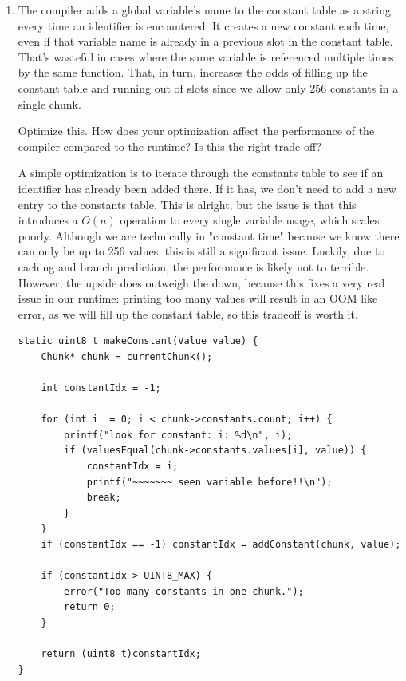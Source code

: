 \documentclass{article}
\begin{document}
\begin{enumerate}
    \item {
        The compiler adds a global variable’s name to the constant table as a string every time an identifier is encountered. It creates a new constant each time, even if that variable name is already in a previous slot in the constant table. That’s wasteful in cases where the same variable is referenced multiple times by the same function. That, in turn, increases the odds of filling up the constant table and running out of slots since we allow only 256 constants in a single chunk.

        Optimize this. How does your optimization affect the performance of the compiler compared to the runtime? Is this the right trade-off?

        A simple optimization is to iterate through the constants table to see if 
        an identifier has already been added there. If it has, we don't need to 
        add a new entry to the constants table. This is alright, but the issue 
        is that this introduces a \(O(n)\) operation to every single variable
        usage, which scales poorly. Although we are technically in "constant time"
        because we know there can only be up to 256 values, this is still a significant 
        issue. Luckily, due to caching and branch prediction, the performance is likely 
        not to terrible. However, the upside does outweigh the down, because this 
        fixes a very real issue in our runtime: printing too many values will 
        result in an OOM like error, as we will fill up the constant table, so 
        this tradeoff is worth it.

        \begin{verbatim}
static uint8_t makeConstant(Value value) {
    Chunk* chunk = currentChunk();

    int constantIdx = -1;

    for (int i  = 0; i < chunk->constants.count; i++) {
        printf("look for constant: i: %d\n", i);
        if (valuesEqual(chunk->constants.values[i], value)) {
            constantIdx = i;
            printf("~~~~~~~ seen variable before!!\n");
            break;
        }
    }
    if (constantIdx == -1) constantIdx = addConstant(chunk, value);

    if (constantIdx > UINT8_MAX) {
        error("Too many constants in one chunk.");
        return 0;
    }

    return (uint8_t)constantIdx;
}
        \end{verbatim}
    }


\end{enumerate}
\end{document}
